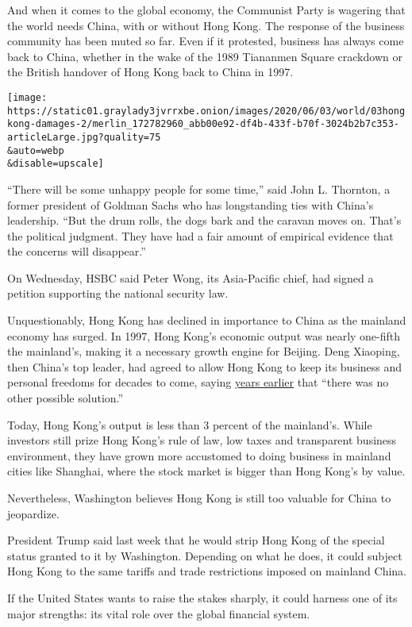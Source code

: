 And when it comes to the global economy, the Communist Party is wagering
that the world needs China, with or without Hong Kong. The response of
the business community has been muted so far. Even if it protested,
business has always come back to China, whether in the wake of the 1989
Tiananmen Square crackdown or the British handover of Hong Kong back to
China in 1997.

\texttt{[image: https://static01.graylady3jvrrxbe.onion/images/2020/06/03/world/03hongkong-damages-2/merlin\_172782960\_abb00e92-df4b-433f-b70f-3024b2b7c353-articleLarge.jpg?quality=75\\\&auto=webp\\\&disable=upscale]}

``There will be some unhappy people for some time,'' said John L.
Thornton, a former president of Goldman Sachs who has longstanding ties
with China's leadership. ``But the drum rolls, the dogs bark and the
caravan moves on. That's the political judgment. They have had a fair
amount of empirical evidence that the concerns will disappear.''

On Wednesday, HSBC said Peter Wong, its Asia-Pacific chief, had signed a
petition supporting the national security law.

Unquestionably, Hong Kong has declined in importance to China as the
mainland economy has surged. In 1997, Hong Kong's economic output was
nearly one-fifth the mainland's, making it a necessary growth engine for
Beijing. Deng Xiaoping, then China's top leader, had agreed to allow
Hong Kong to keep its business and personal freedoms for decades to
come, saying
\href{https://www.nytimes3xbfgragh.onion/1997/06/30/world/a-partly-alien-place-joins-china-today.html}{years
earlier} that ``there was no other possible solution.''

Today, Hong Kong's output is less than 3 percent of the mainland's.
While investors still prize Hong Kong's rule of law, low taxes and
transparent business environment, they have grown more accustomed to
doing business in mainland cities like Shanghai, where the stock market
is bigger than Hong Kong's by value.

Nevertheless, Washington believes Hong Kong is still too valuable for
China to jeopardize.

President Trump said last week that he would strip Hong Kong of the
special status granted to it by Washington. Depending on what he does,
it could subject Hong Kong to the same tariffs and trade restrictions
imposed on mainland China.

If the United States wants to raise the stakes sharply, it could harness
one of its major strengths: its vital role over the global financial
system.

